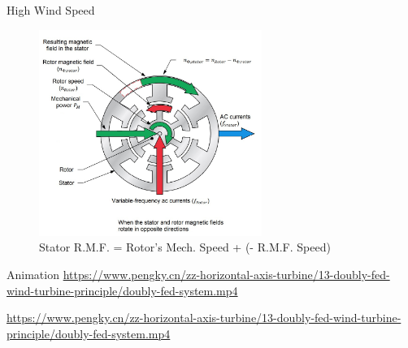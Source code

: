 \documentclass{beamer}
\begin{document}
\begin{frame}{High Wind Speed}
    \begin{figure}
        \centering
        \includegraphics[width=2.85in]{imgs/dfigOP opposite.jpg}
        \caption{Stator R.M.F. = Rotor's Mech. Speed +  (- R.M.F. Speed)}
    \end{figure}
\end{frame}

\begin{frame}{Animation}
    \href{}{https://www.pengky.cn/zz-horizontal-axis-turbine/13-doubly-fed-wind-turbine-principle/doubly-fed-system.mp4}
    

    \href{}{https://www.pengky.cn/zz-horizontal-axis-turbine/13-doubly-fed-wind-turbine-principle/doubly-fed-system.mp4}

    
\end{frame}
\end{document}
